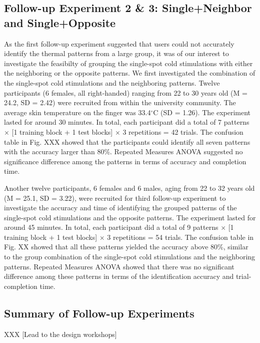 \documentclass[preprint,12pt]{elsarticle}
\begin{document}

\subsection{Follow-up Experiment 2 \& 3: Single+Neighbor and Single+Opposite}
As the first follow-up experiment suggested that users could not accurately identify the thermal patterns from a large group, it was of our interest to investigate the feasibilty of grouping the single-spot cold stimulations with either the neighboring or the opposite patterns. We first investigated the combination of the single-spot cold stimulations and the neighboring patterns. Twelve participants (6 females, all right-handed) ranging from 22 to 30 years old (M = 24.2, SD = 2.42) were recruited from within the university community. The average skin temperature on the finger was 33.4$^{\circ}$C (SD = 1.26). The experiment lasted for around 30 minutes. In total, each participant did a total of 7 patterns $\times$ [1 training block + 1 test blocks] $\times$ 3 repetitions = 42 trials.  The confusion table in Fig. XXX showed that the participants could identify all seven patterns with the accuracy larger than 80\%. Repeated Measures ANOVA suggested no significance difference among the patterns in terms of accuracy and completion time.

Another twelve participants, 6 females and 6 males, aging from 22 to 32 years old (M = 25.1, SD = 3.22), were recruited for third follow-up experiment to investigate the accuracy and time of identifying the grouped patterns of the single-spot cold stimulations and the opposite patterns. The experiment lasted for around 45 minutes. In total, each participant did a total of 9 patterns $\times$ [1 training block + 1 test blocks] $\times$ 3 repetitions = 54 trials. The confusion table in Fig. XX showed that all these patterns yielded the accuracy above 80\%, similar to the group combination of the single-spot cold stimulations and the neighboring patterns. Repeated Measures ANOVA showed that there was no significant difference among these patterns in terms of the identification accuracy and trial-completion time.

\subsection{Summary of Follow-up Experiments}
XXX
[Lead to the design workshops]
\end{document}
